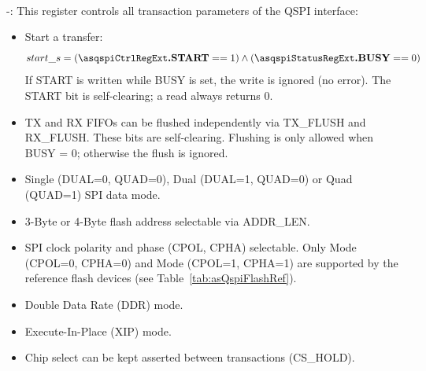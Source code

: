 \paragraph{\asqspiCtrlRegExt} -:
This register controls all transaction parameters of the QSPI interface:
\begin{itemize}
  \item Start a transfer:
    \[ start\_s = (\asqspiCtrlRegExt\textbf{.START} == 1) \land (\asqspiStatusRegExt\textbf{.BUSY} == 0) \]
    If START is written while BUSY is set, the write is ignored (no error).
    The START bit is self-clearing; a read always returns 0.
  \item TX and RX FIFOs can be flushed independently via TX\_FLUSH and RX\_FLUSH.
    These bits are self-clearing. Flushing is only allowed when BUSY = 0;
    otherwise the flush is ignored.
  \item Single (DUAL=0, QUAD=0), Dual (DUAL=1, QUAD=0) or Quad (QUAD=1) SPI data mode.
  \item 3-Byte or 4-Byte flash address selectable via ADDR\_LEN.
  \item SPI clock polarity and phase (CPOL, CPHA) selectable. Only Mode
    (CPOL=0, CPHA=0) and Mode (CPOL=1, CPHA=1) are supported by the
    reference flash devices (see Table~\ref{tab:asQspiFlashRef}).
  \item Double Data Rate (DDR) mode.
  \item Execute-In-Place (XIP) mode.
  \item Chip select can be kept asserted between transactions (CS\_HOLD).
\end{itemize}

